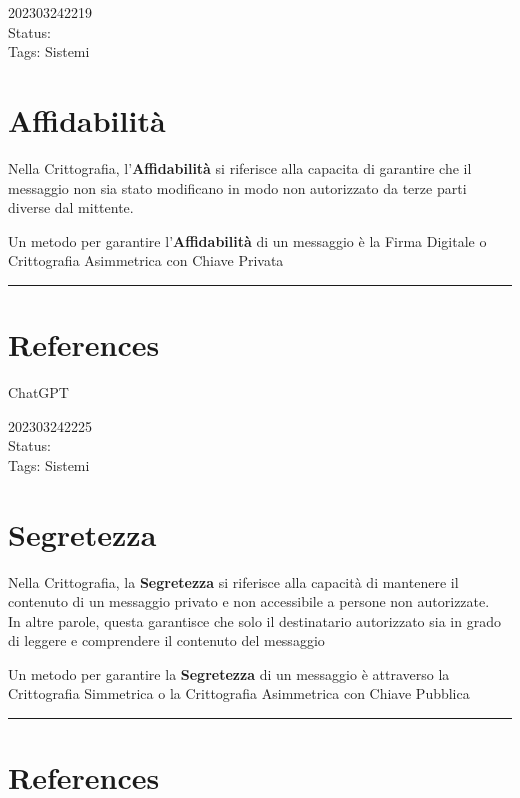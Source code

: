 \documentclass[
]{article}
\begin{document}
202303242219\\
Status:\\
Tags: Sistemi

\hypertarget{affidabilituxe0}{%
\section{Affidabilità}\label{affidabilituxe0}}

Nella Crittografia, l'\textbf{Affidabilità} si riferisce alla capacita
di garantire che il messaggio non sia stato modificano in modo non
autorizzato da terze parti diverse dal mittente.

Un metodo per garantire l'\textbf{Affidabilità} di un messaggio è la
Firma Digitale o Crittografia Asimmetrica con Chiave Privata

\begin{center}\rule{0.5\linewidth}{0.5pt}\end{center}

\hypertarget{references-1}{%
\section{References}\label{references-1}}

ChatGPT

\hfill\break

202303242225\\
Status:\\
Tags: Sistemi

\hypertarget{segretezza}{%
\section{Segretezza}\label{segretezza}}

Nella Crittografia, la \textbf{Segretezza} si riferisce alla capacità di
mantenere il contenuto di un messaggio privato e non accessibile a
persone non autorizzate.\\
In altre parole, questa garantisce che solo il destinatario autorizzato
sia in grado di leggere e comprendere il contenuto del messaggio

Un metodo per garantire la \textbf{Segretezza} di un messaggio è
attraverso la Crittografia Simmetrica o la Crittografia Asimmetrica con
Chiave Pubblica

\begin{center}\rule{0.5\linewidth}{0.5pt}\end{center}

\hypertarget{references-2}{%
\section{References}\label{references-2}}
\end{document}
